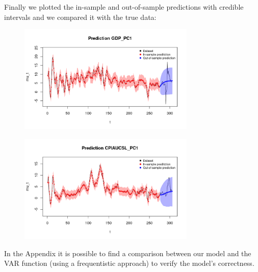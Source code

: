 Finally we plotted the in-sample and out-of-sample predictions with credible intervals and we compared it with the true data: \\  
\begin{figure}[H]
    \centering
    \includegraphics[width=0.75\textwidth]{images/6-VAR/gdp_prediction.png}
    \label{fig:VAR_first}
\end{figure}
\begin{figure}[H]
    \centering
    \includegraphics[width=0.75\textwidth]{images/6-VAR/infl_prediction.png}
    \label{fig:VAR_second}
\end{figure}
In the Appendix it is possible to find a comparison between our model and the VAR function (using a frequentistic approach) to verify the model's correctness.
